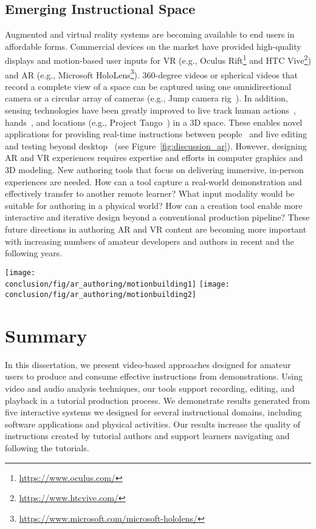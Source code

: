 \subsection{Emerging Instructional Space}
Augmented and virtual reality systems are becoming available to end users in affordable forms. Commercial devices on the market have provided high-quality displays and motion-based user inputs for VR (e.g., Oculus Rift\footnote{\url{https://www.oculus.com/}} and HTC Vive\footnote{\url{https://www.htcvive.com/}}) and AR (e.g., Microsoft HoloLens\footnote{\url{https://www.microsoft.com/microsoft-hololens/}}). 360-degree videos or spherical videos that record a complete view of a space can be captured using one omnidirectional camera or a circular array of cameras (e.g., Jump camera rig~\cite{GoogleJump}).
%
In addition, sensing technologies have been greatly improved to live track human actions~\cite{dou-siggraph2016}, hands~\cite{taylor-siggraph2016}, and locations (e.g., Project Tango~\cite{GoogleTango}) in a 3D space.
%
These enables novel applications for providing real-time instructions between people~\cite{Gurevich:2012ko,MicrosoftHoloLensSkype} and live editing and testing beyond desktop~\cite{MotionBuilderAR} (see Figure~\ref{fig:discussion_ar}).
%
However, designing AR and VR experiences requires expertise and efforts in computer graphics and 3D modeling. New authoring tools that focus on delivering immersive, in-person experiences are needed.
How can a tool capture a real-world demonstration and effectively transfer to another remote learner? What input modality would be suitable for authoring in a physical world? How can a creation tool enable more interactive and iterative design beyond a conventional production pipeline?
%
These future directions in authoring AR and VR content are becoming more important with increasing numbers of amateur developers and authors in recent and the following years.

\begin{figure*}[ht!]
  \centering
  \texttt{[image: \\conclusion/fig/ar\_authoring/motionbuilding1]}
  \texttt{[image: \\conclusion/fig/ar\_authoring/motionbuilding2]}
  \caption{
    A recent Augmented Reality (AR) application enables reviewing character animation beyond a desktop in a room-size environment~\cite{MotionBuilderAR}, licensed under CC BY 2.0.
  }
  \label{fig:discussion_ar}
\end{figure*}

\section{Summary}
In this dissertation, we present video-based approaches designed for amateur users to produce and consume effective instructions from demonstrations. Using video and audio analysis techniques, our tools support recording, editing, and playback in a tutorial production process. We demonstrate results generated from five interactive systems we designed for several instructional domains, including software applications and physical activities. Our results increase the quality of instructions created by tutorial authors and support learners navigating and following the tutorials.
